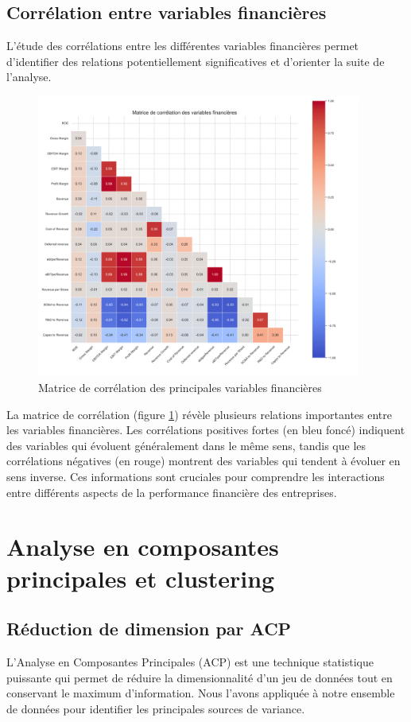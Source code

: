 \documentclass[11pt]{report}
\begin{document}
\section{Corrélation entre variables financières}
L'étude des corrélations entre les différentes variables financières permet d'identifier des relations potentiellement significatives et d'orienter la suite de l'analyse.

\begin{figure}[H]
    \centering
    \includegraphics[width=0.95\textwidth]{figures/correlation_matrix.png}
    \caption{Matrice de corrélation des principales variables financières}
    \label{fig:correlation_matrix}
\end{figure}

La matrice de corrélation (figure \ref{fig:correlation_matrix}) révèle plusieurs relations importantes entre les variables financières. Les corrélations positives fortes (en bleu foncé) indiquent des variables qui évoluent généralement dans le même sens, tandis que les corrélations négatives (en rouge) montrent des variables qui tendent à évoluer en sens inverse. Ces informations sont cruciales pour comprendre les interactions entre différents aspects de la performance financière des entreprises.

\chapter{Analyse en composantes principales et clustering}
\section{Réduction de dimension par ACP}
L'Analyse en Composantes Principales (ACP) est une technique statistique puissante qui permet de réduire la dimensionnalité d'un jeu de données tout en conservant le maximum d'information. Nous l'avons appliquée à notre ensemble de données pour identifier les principales sources de variance.
\end{document}
